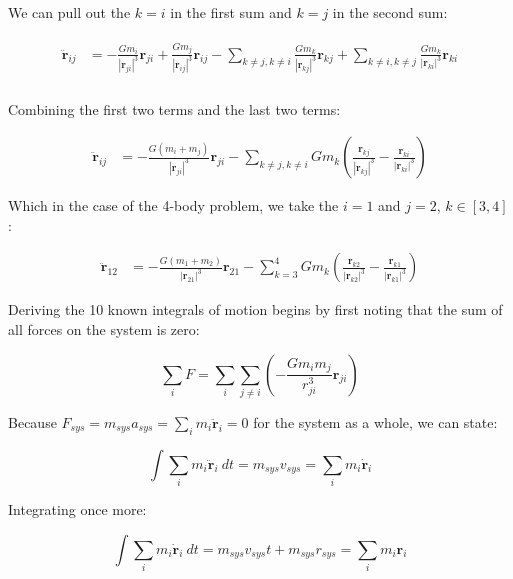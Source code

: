 \documentclass[
]{article}
\begin{document}
We can pull out the \(k=i\) in the first sum and \(k=j\) in the second
sum:

\[\begin{aligned}
\begin{aligned}
    \ddot{\mathbf{r}}_{ij} &= -\frac{G m_i}{\left| \mathbf{r}_{ji} \right|^3} \mathbf{r}_{ji} + \frac{G m_j}{\left| \mathbf{r}_{ij} \right|^3} \mathbf{r}_{ij} -\sum_{k\neq j, k\neq i} \frac{G m_k}{\left| \mathbf{r}_{kj} \right|^3} \mathbf{r}_{kj} + \sum_{k\neq i, k\neq j} \frac{G m_k}{\left| \mathbf{r}_{ki} \right|^3} \mathbf{r}_{ki} \\
\end{aligned}
\end{aligned}\]

Combining the first two terms and the last two terms:

\[\begin{aligned}
    \ddot{\mathbf{r}}_{ij} &= -\frac{G (m_i + m_j)}{\left| \mathbf{r}_{ji} \right|^3} \mathbf{r}_{ji} - \sum_{k\neq j, k\neq i} G m_k \left(\frac{\mathbf{r}_{kj}}{{\left| \mathbf{r}_{kj} \right|^3}} - \frac{\mathbf{r}_{ki}}{{\left| \mathbf{r}_{ki} \right|^3}}\right)
\end{aligned}\]

Which in the case of the 4-body problem, we take the \(i=1\) and
\(j=2\), \(k \in [3,4]\):

\[\begin{aligned}
    \ddot{\mathbf{r}}_{12} &= -\frac{G (m_1 + m_2)}{\left| \mathbf{r}_{21} \right|^3} \mathbf{r}_{21} - \sum_{k=3}^4 G m_k \left(\frac{\mathbf{r}_{k2}}{{\left| \mathbf{r}_{k2} \right|^3}} - \frac{\mathbf{r}_{k1}}{{\left| \mathbf{r}_{k1} \right|^3}}\right)
\end{aligned}\]

Deriving the 10 known integrals of motion begins by first noting that
the sum of all forces on the system is zero:

\[\sum_i F = \sum_i \sum_{j \neq i} \left( -\frac{G m_i m_j}{r_{ji}^3} \mathbf{r}_{ji} \right)\]

Because
\(F_{sys} = m_{sys} a_{sys} = \sum_i m_i \ddot{\mathbf{r}}_i = 0\) for
the system as a whole, we can state:

\[\int \sum_i m_i \ddot{\mathbf{r}}_i \: dt = m_{sys} v_{sys} = \sum_i m_i \dot{\mathbf{r}}_i\]

Integrating once more:

\[\int \sum_i m_i \dot{\mathbf{r}}_i \: dt = m_{sys} v_{sys} t + m_{sys} r_{sys}  = \sum_i m_i \mathbf{r}_i\]
\end{document}

